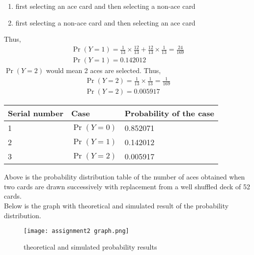 \documentclass[journal,12pt,twocolumn]{IEEEtran}
\begin{document}
\begin{enumerate}
    \item first selecting an ace card and then selecting a non-ace card 
    \item first selecting a non-ace card and then selecting an ace card
\end{enumerate}
Thus,
\begin{align}
    \Pr(Y=1) = \frac{1}{13} \times \frac{12}{13} + \frac{12}{13} \times \frac{1}{13} = \frac{24}{169}
    \\\Pr(Y=1) = 0.142012
\end{align}
$\Pr(Y=2)$ would mean 2 aces are selected. Thus,
\begin{align}
    \Pr(Y=2) = \frac{1}{13} \times \frac{1}{13} = \frac{1}{169}
    \\\Pr(Y=2) = 0.005917
\end{align}
\begin{center}
\begin{tabular}{ | m{2.5cm} | m{2cm}| m{4cm} | } 
\hline
Serial number & Case & Probability of the case \\ 
\hline
1 & $\Pr(Y=0)$ & 0.852071 \\ 
\hline
2 & $\Pr(Y=1)$ & 0.142012 \\ 
\hline
3 & $\Pr(Y=2)$ & 0.005917 \\
\hline

\end{tabular}
\end{center}
Above is the probability distribution table of the number of aces obtained when two cards are drawn successively with replacement from a well shuffled deck of 52 cards.
\\Below is the graph with theoretical and simulated result of the probability distribution.
\begin{figure}[h]
    \texttt{[image: assignment2 graph.png]}
    \caption{theoretical and simulated probability results}
\end{figure}
\end{document}
